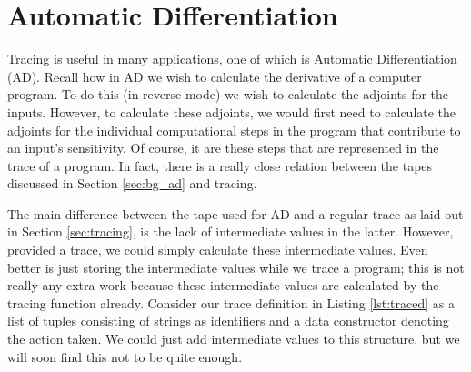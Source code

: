 \clearpage
\section{Automatic Differentiation} \label{sec:ad}
    Tracing is useful in many applications, one of which is Automatic Differentiation (AD).
    Recall how in AD we wish to calculate the derivative of a computer program.
    To do this (in reverse-mode) we wish to calculate the adjoints for the inputs.
    However, to calculate these adjoints, we would first need to calculate the adjoints for the individual computational steps in the program that contribute to an input's sensitivity.
    Of course, it are these steps that are represented in the trace of a program.
    In fact, there is a really close relation between the tapes discussed in Section \ref{sec:bg_ad} and tracing.

    The main difference between the tape used for AD and a regular trace as laid out in Section \ref{sec:tracing}, is the lack of intermediate values in the latter.
    However, provided a trace, we could simply calculate these intermediate values.
    Even better is just storing the intermediate values while we trace a program; this is not really any extra work because these intermediate values are calculated by the tracing function already.
    Consider our trace definition in Listing \ref{lst:traced} as a list of tuples consisting of strings as identifiers and a data constructor denoting the action taken.
    We could just add intermediate values to this structure, but we will soon find this not to be quite enough.
    
